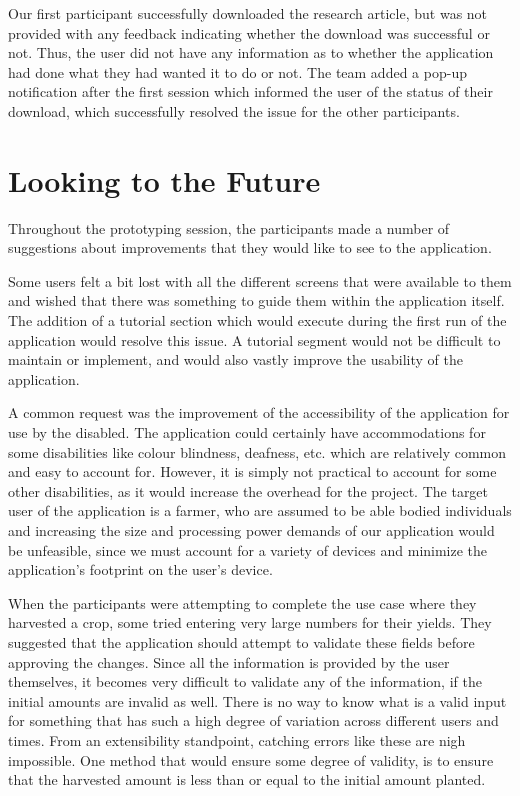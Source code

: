 \documentclass[12pt,letterpaper]{article}
\begin{document}
Our first participant successfully downloaded the research article, but was not provided with any feedback indicating whether the download was successful or not. Thus, the user did not have any information as to whether the application had done what they had wanted it to do or not. The team added a pop-up notification after the first session which informed the user of the status of their download, which successfully resolved the issue for the other participants.

\clearpage
\section{Looking to the Future}
Throughout the prototyping session, the participants made a number of suggestions about improvements that they would like to see to the application.\par
Some users felt a bit lost with all the different screens that were available to them and wished that there was something to guide them within the application itself. The addition of a tutorial section which would execute during the first run of the application would resolve this issue. A tutorial segment would not be difficult to maintain or implement, and would also vastly improve the usability of the application.\par
A common request was the improvement of the accessibility of the application for use by the disabled. The application could certainly have accommodations for some disabilities like colour blindness, deafness, etc. which are relatively common and easy to account for. However, it is simply not practical to account for some other disabilities, as it would increase the overhead for the project. The target user of the application is a farmer, who are assumed to be able bodied individuals and increasing the size and processing power demands of our application would be unfeasible, since we must account for a variety of devices and minimize the application's footprint on the user's device.\par
When the participants were attempting to complete the use case where they harvested a crop, some tried entering very large numbers for their yields. They suggested that the application should attempt to validate these fields before approving the changes. Since all the information is provided by the user themselves, it becomes very difficult to validate any of the information, if the initial amounts are invalid as well. There is no way to know what is a valid input for something that has such a high degree of variation across different users and times. From an extensibility standpoint, catching errors like these are nigh impossible. One method that would ensure some degree of validity, is to ensure that the harvested amount is less than or equal to the initial amount planted.\par
\end{document}
